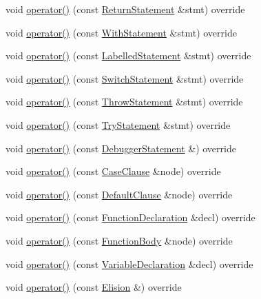 \begin{DoxyCompactItemize}
\item 
void \hyperlink{struct_basic_visitor_ac7a0c630d96799333d3d32c8ca465f51}{operator()} (const \hyperlink{struct_return_statement}{Return\+Statement} \&stmt) override
\item 
void \hyperlink{struct_basic_visitor_a3dafb609d4df2fa786f7fe4fb25f1b9d}{operator()} (const \hyperlink{struct_with_statement}{With\+Statement} \&stmt) override
\item 
void \hyperlink{struct_basic_visitor_ae53f4199cddb021c0f30f898796942c4}{operator()} (const \hyperlink{struct_labelled_statement}{Labelled\+Statement} \&stmt) override
\item 
void \hyperlink{struct_basic_visitor_af97609b1ab2068d18ea5e94240819ccb}{operator()} (const \hyperlink{struct_switch_statement}{Switch\+Statement} \&stmt) override
\item 
void \hyperlink{struct_basic_visitor_a19c4ebe7b4d6d1cbddc354cf8e8267e4}{operator()} (const \hyperlink{struct_throw_statement}{Throw\+Statement} \&stmt) override
\item 
void \hyperlink{struct_basic_visitor_a2b4e8d7c1f46d71adbc8bf2f4b597fcc}{operator()} (const \hyperlink{struct_try_statement}{Try\+Statement} \&stmt) override
\item 
void \hyperlink{struct_basic_visitor_a193c296097cb56beab2cc74165668df8}{operator()} (const \hyperlink{struct_debugger_statement}{Debugger\+Statement} \&) override
\item 
void \hyperlink{struct_basic_visitor_ae3d4b26dfc7eaae787a33d9e1e73bc2e}{operator()} (const \hyperlink{struct_case_clause}{Case\+Clause} \&node) override
\item 
void \hyperlink{struct_basic_visitor_ae0235e556d05ba170398dcd7f0c25cb1}{operator()} (const \hyperlink{struct_default_clause}{Default\+Clause} \&node) override
\item 
void \hyperlink{struct_basic_visitor_a2871985a62b51f8f5212a5a65e47b7b8}{operator()} (const \hyperlink{struct_function_declaration}{Function\+Declaration} \&decl) override
\item 
void \hyperlink{struct_basic_visitor_ac9435a48d44ce32bd726cbf46bcc9032}{operator()} (const \hyperlink{struct_function_body}{Function\+Body} \&node) override
\item 
void \hyperlink{struct_basic_visitor_a0405c0df4a21c4735feaa98f5cd0cfa9}{operator()} (const \hyperlink{struct_variable_declaration}{Variable\+Declaration} \&decl) override
\item 
void \hyperlink{struct_basic_visitor_af64d7b88cbffe3d0717e9607704f56da}{operator()} (const \hyperlink{struct_elision}{Elision} \&) override

\end{DoxyCompactItemize}
